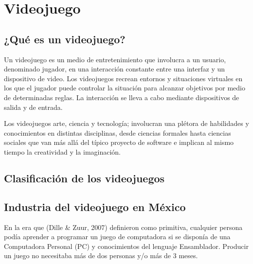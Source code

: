 \section{Videojuego}
			\subsection{¿Qué es un videojuego?}
			Un videojuego es un medio de entretenimiento
			que involucra a un usuario, denominado jugador, en
			una interacción constante entre una interfaz y un
			dispositivo de video. Los videojuegos recrean
			entornos y situaciones virtuales en los que el jugador
			puede controlar la situación para
			alcanzar objetivos por medio de determinadas reglas.
			La interacción se lleva a cabo mediante
			dispositivos de salida y de entrada.
		
			Los videojuegos arte, ciencia y tecnología;
			involucran una plétora de habilidades y
			conocimientos en distintas disciplinas, desde ciencias
			formales hasta ciencias sociales que van más allá del
			típico proyecto de software e implican al mismo
			tiempo la creatividad y la imaginación.
			
			\subsection{Clasificación de los videojuegos}
			\subsection{Industria del videojuego en México}
			En la era que (Dille \& Zuur, 2007) definieron
			como primitiva, cualquier persona podía aprender a
			programar un juego de computadora si se disponía de
			una Computadora Personal (PC) y conocimientos del
			lenguaje Ensamblador. Producir un juego no
			necesitaba más de dos personas y/o más de 3 meses.	
		